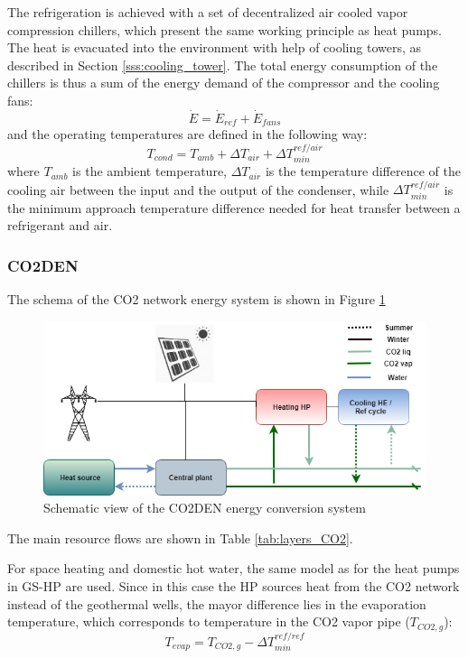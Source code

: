 \documentclass{article}
\begin{document}
The refrigeration is achieved with a set of decentralized air cooled vapor compression chillers, which present the same working principle as heat pumps. The heat is evacuated into the environment with help of cooling towers, as described in Section \ref{sss:cooling_tower}.
The total energy consumption of the chillers is thus a sum of the energy demand of the compressor and the cooling fans:
\begin{equation}
\dot{E} = \dot{E}_{ref} + \dot{E}_{fans}
\end{equation}
and the operating temperatures are defined in the following way:
\begin{equation}
    T_{cond} = T_{amb} + \Delta T_{air} + \Delta T_{min}^{ref/air}
\end{equation}
where $T_{amb}$ is the ambient temperature, $\Delta T_{air}$ is the temperature difference of the cooling air between the input and the output of the condenser, while $\Delta T_{min}^{ref/air}$ is the minimum approach temperature difference needed for heat transfer between a refrigerant and air.\\

\subsubsection{CO2DEN}\label{sss:CO2DEN}
The schema of the CO2 network energy system is shown in Figure \ref{fig:energyschema}

\begin{figure}[tph]
	\centering
	\includegraphics[width=1\linewidth]{Images/energy_schema}
	\caption{Schematic view of the CO2DEN energy conversion system}
	\label{fig:energyschema}
\end{figure}


The main resource flows are shown in Table \ref{tab:layers_CO2}.


For space heating and domestic hot water, the same model as for the heat pumps in GS-HP are used. Since in this case the HP sources heat from the CO2 network instead of the geothermal wells, the mayor difference lies in the evaporation temperature, which corresponds to temperature in the CO2 vapor pipe ($T_{CO2,g}$):
\begin{equation}
    T_{evap} = T_{CO2,g} - \Delta T_{min}^{ref/ref}
\end{equation}
\end{document}
